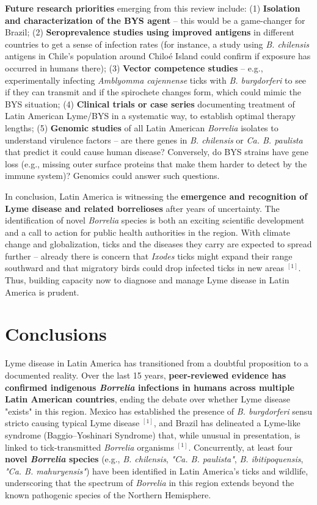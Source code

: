\documentclass[11pt,letterpaper]{article}
\newcommand{\mycite}[1]{$^{[#1]}$}
\begin{document}
\textbf{Future research priorities} emerging from this review include: (1) \textbf{Isolation and characterization of the BYS agent} – this would be a game-changer for Brazil; (2) \textbf{Seroprevalence studies using improved antigens} in different countries to get a sense of infection rates (for instance, a study using \textit{B. chilensis} antigens in Chile's population around Chiloé Island could confirm if exposure has occurred in humans there); (3) \textbf{Vector competence studies} – e.g., experimentally infecting \textit{Amblyomma cajennense} ticks with \textit{B. burgdorferi} to see if they can transmit and if the spirochete changes form, which could mimic the BYS situation; (4) \textbf{Clinical trials or case series} documenting treatment of Latin American Lyme/BYS in a systematic way, to establish optimal therapy lengths; (5) \textbf{Genomic studies} of all Latin American \textit{Borrelia} isolates to understand virulence factors – are there genes in \textit{B. chilensis} or \textit{Ca. B. paulista} that predict it could cause human disease? Conversely, do BYS strains have gene loss (e.g., missing outer surface proteins that make them harder to detect by the immune system)? Genomics could answer such questions.

In conclusion, Latin America is witnessing the \textbf{emergence and recognition of Lyme disease and related borrelioses} after years of uncertainty. The identification of novel \textit{Borrelia} species is both an exciting scientific development and a call to action for public health authorities in the region. With climate change and globalization, ticks and the diseases they carry are expected to spread further – already there is concern that \textit{Ixodes} ticks might expand their range southward and that migratory birds could drop infected ticks in new areas \mycite{1}. Thus, building capacity now to diagnose and manage Lyme disease in Latin America is prudent.

\section{Conclusions}
Lyme disease in Latin America has transitioned from a doubtful proposition to a documented reality. Over the last 15 years, \textbf{peer-reviewed evidence has confirmed indigenous \textit{Borrelia} infections in humans across multiple Latin American countries}, ending the debate over whether Lyme disease "exists" in this region. Mexico has established the presence of \textit{B. burgdorferi} sensu stricto causing typical Lyme disease \mycite{1}, and Brazil has delineated a Lyme-like syndrome (Baggio–Yoshinari Syndrome) that, while unusual in presentation, is linked to tick-transmitted \textit{Borrelia} organisms \mycite{1}. Concurrently, at least four \textbf{novel \textit{Borrelia} species} (e.g., \textit{B. chilensis}, \textit{"Ca. B. paulista"}, \textit{B. ibitipoquensis}, \textit{"Ca. B. mahuryensis"}) have been identified in Latin America's ticks and wildlife, underscoring that the spectrum of \textit{Borrelia} in this region extends beyond the known pathogenic species of the Northern Hemisphere.
\end{document}
